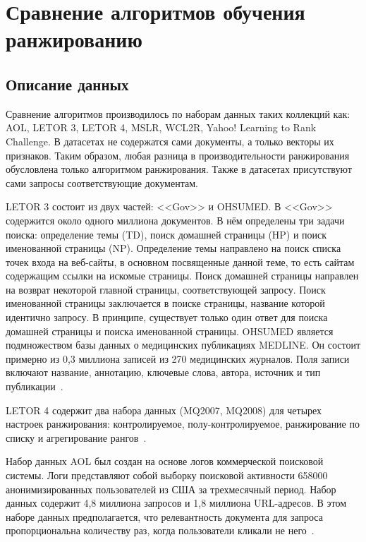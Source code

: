\chapter[Сравнение алгоритмов обучения ранжированию]{Сравнение алгоритмов обучения\\ранжированию}

\section{Описание данных}

Сравнение алгоритмов производилось по наборам данных таких коллекций как: AOL, LETOR 3, LETOR 4, MSLR, WCL2R, Yahoo! Learning to Rank Challenge. В датасетах не содержатся  сами документы, а только векторы их признаков. Таким образом, любая разница в производительности ранжирования обусловлена только алгоритмом ранжирования. Также в датасетах присутствуют сами запросы соответствующие документам.  

LETOR 3 состоит из двух частей: <<Gov>> и OHSUMED. В <<Gov>> содержится около одного миллиона документов. В нём определены три задачи поиска: определение темы (TD), поиск домашней страницы (HP) и поиск именованной страницы (NP). Определение темы направлено на поиск списка
точек входа на веб-сайты, в основном посвященные данной теме, то есть сайтам содержащим ссылки на искомые страницы. Поиск домашней страницы направлен на возврат некоторой главной страницы, соответствующей запросу. Поиск именованной страницы заключается в поиске страницы, название которой идентично запросу. В принципе, существует только один ответ для поиска домашней страницы и поиска именованной страницы. OHSUMED является подмножеством базы данных о медицинских публикациях MEDLINE. Он состоит примерно из 0,3 миллиона записей из 270 медицинских журналов. Поля записи включают название, аннотацию, ключевые слова, автора, источник и тип публикации~\cite{LETOR3}. 

LETOR 4 содержит два набора данных (MQ2007, MQ2008) для четырех настроек ранжирования: контролируемое, полу-контролируемое, ранжирование по списку и агрегирование рангов~\cite{AOL}.

Набор данных AOL был создан на основе логов коммерческой поисковой системы. Логи
представляют собой выборку поисковой активности 658000 анонимизированных пользователей из США за трехмесячный период. Набор данных содержит 4,8 миллиона запросов и 1,8 миллиона URL-адресов. В
этом наборе данных предполагается, что релевантность документа для запроса пропорциональна количеству раз, когда пользователи кликали не него~\cite{AOL}.

